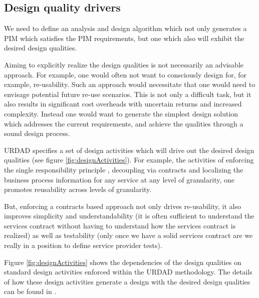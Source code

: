 
\subsection{Design quality drivers}

We need to define an analysis and design algorithm which not only generates a
PIM which satisfies the PIM requirements, but one which also will exhibit
the desired design qualities.

Aiming to explicitly realize the design qualities is not necessarily an advisable
approach. For example,  one would often not want to
consciously design for, for example, re-usability. Such an approach would
necessitate that one would need to envisage potential future re-use scenarios.
This is not only a difficult task, but it also results in significant cost
overheads with uncertain returns and increased complexity. Instead one would want
to generate the simplest design solution which addresses the current requirements,
and achieve the qualities through a sound design process.

URDAD specifies a set of design activities which will drive out the desired
design qualities (see figure \ref{fig:designActivities}).
For example, the activities of enforcing the single
responsibility principle \cite{wirfs-brock:objectDesign,
wirfs-brock:responsibilityDrivenApproach}, decoupling via contracts
\cite{meyer:designByContract} and localizing the business process information
for any service at any level of granularity, one promotes reusability across
levels of granularity.

But, enforcing a contracts based approach not only drives re-usability, it also
improves simplicity and understandability (it is often sufficient to understand the
services contract without having to understand how the services contract is
realized) as well as testability (only once we have a solid services contract are we
really in a position to define service provider tests).

Figure \ref{fig:designActivities} shows the dependencies of the design qualities on
standard design activities enforced within the URDAD methodology. The details of
how these design activities generate a design with the desired design qualities
can be found in \cite{solms:urdad}.

